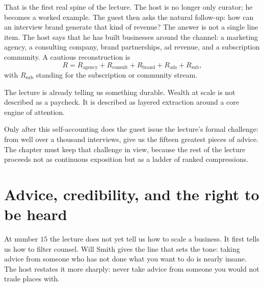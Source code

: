 That is the first real spine of the lecture. The host is no longer only curator; he becomes a worked example. The guest then asks the natural follow-up: how can an interview brand generate that kind of revenue? The answer is not a single line item. The host says that he has built businesses around the channel: a marketing agency, a consulting company, brand partnerships, ad revenue, and a subscription community. A cautious reconstruction is
\begin{equation}
R = R_{\mathrm{agency}} + R_{\mathrm{consult}} + R_{\mathrm{brand}} + R_{\mathrm{ads}} + R_{\mathrm{sub}},
\end{equation}
with \(R_{\mathrm{sub}}\) standing for the subscription or community stream.

The lecture is already telling us something durable. Wealth at scale is not described as a paycheck. It is described as layered extraction around a core engine of attention.

\begin{figure}[h]
\centering
{}
\end{figure}

Only after this self-accounting does the guest issue the lecture's formal challenge: from well over a thousand interviews, give us the fifteen greatest pieces of advice. The chapter must keep that challenge in view, because the rest of the lecture proceeds not as continuous exposition but as a ladder of ranked compressions.

\section{Advice, credibility, and the right to be heard}

At number \(15\) the lecture does not yet tell us how to scale a business. It first tells us how to filter counsel. Will Smith gives the line that sets the tone: taking advice from someone who has not done what you want to do is nearly insane. The host restates it more sharply: never take advice from someone you would not trade places with.

